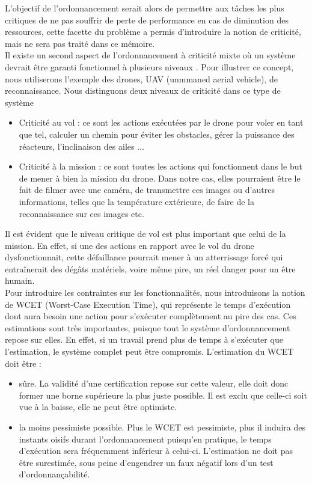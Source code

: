 \documentclass[12pt,a4paper,oneside]{book}
\theoremstyle{break}
\theoremstyle{breakplain}
\begin{document}
L'objectif de l'ordonnancement serait alors de permettre aux tâches les plus critiques de ne pas souffrir de perte de performance en cas de diminution des ressources, cette facette du problème a permis d'introduire la notion de criticité, mais ne sera pas traité dans ce mémoire.\\

Il existe un second aspect de l'ordonnancement à criticité mixte où un système devrait être garanti fonctionnel à plusieurs niveaux \cite{barhorst2009research}. Pour illustrer ce concept, nous utiliserons l'exemple des drones, UAV (unmmaned aerial vehicle), de reconnaissance. Nous distinguons deux niveaux de criticité dans ce type de système

\begin{itemize}
\item Criticité au vol : ce sont les actions exécutées par le drone pour voler en tant que tel, calculer un chemin pour éviter les obstacles, gérer la puissance des réacteurs, l'inclinaison des ailes ...
\item Criticité à la mission : ce sont toutes les actions qui fonctionnent dans le but de mener à bien la mission du drone. Dans notre cas, elles pourraient être le fait de filmer avec une caméra, de transmettre ces images ou d'autres informations, telles que la température extérieure, de faire de la reconnaissance sur ces images etc.\\
\end{itemize}

Il est évident que le niveau critique de vol est plus important que celui de la mission. En effet, si une des actions en rapport avec le vol du drone dysfonctionnait, cette défaillance pourrait mener à un atterrissage forcé qui entraînerait des dégâts matériels, voire même pire, un réel danger pour un être humain.\\

Pour introduire les contraintes sur les fonctionnalités, nous introduisons la notion de WCET (Worst-Case Execution Time), qui représente le temps d'exécution dont aura besoin une action pour s'exécuter complètement au pire des cas. Ces estimations sont très importantes, puisque tout le système d'ordonnancement repose sur elles. En effet, si un travail prend plus de temps à s'exécuter que l'estimation, le système complet peut être compromis. L'estimation du WCET doit être \cite{santy2012ordonnancement} :

\begin{itemize}
\item sûre. La validité d'une certification repose sur cette valeur, elle doit donc former une borne supérieure la plus juste possible. Il est exclu que celle-ci soit vue à la baisse, elle ne peut être optimiste.
\item la moins pessimiste possible. Plus le WCET est pessimiste, plus il induira des instants oisifs durant l'ordonnancement puisqu'en pratique, le temps d'exécution sera fréquemment inférieur à celui-ci. L'estimation ne doit pas être surestimée, sous peine d'engendrer un faux négatif lors d'un test d'ordonnançabilité.\\
\end{itemize}
\end{document}

